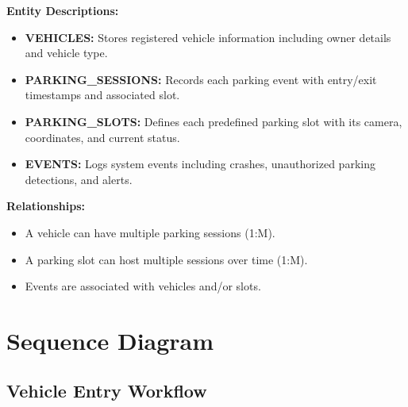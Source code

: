 \documentclass[12pt,a4paper]{report}
\begin{document}
\textbf{Entity Descriptions:}
\begin{itemize}
    \item \textbf{VEHICLES:} Stores registered vehicle information including owner details and vehicle type.
    \item \textbf{PARKING\_SESSIONS:} Records each parking event with entry/exit timestamps and associated slot.
    \item \textbf{PARKING\_SLOTS:} Defines each predefined parking slot with its camera, coordinates, and current status.
    \item \textbf{EVENTS:} Logs system events including crashes, unauthorized parking detections, and alerts.
\end{itemize}

\textbf{Relationships:}
\begin{itemize}
    \item A vehicle can have multiple parking sessions (1:M).
    \item A parking slot can host multiple sessions over time (1:M).
    \item Events are associated with vehicles and/or slots.
\end{itemize}


\section{Sequence Diagram}

\subsection{Vehicle Entry Workflow}
\end{document}
